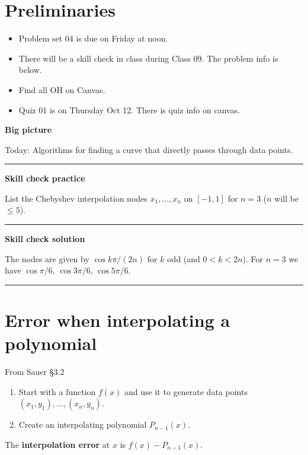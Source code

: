 \documentclass[12pt,letterpaper,noanswers]{exam}
\begin{document}
 \pdfpageheight 11in 
  \pdfpagewidth 8.5in

\noindent 

\section*{Preliminaries}

\begin{itemize}
\itemsep0pt
\item Problem set 04 is due on Friday at noon.
\item There will be a skill check in class during Class 09.  The problem info is below.
\item Find all OH on Canvas.
\item Quiz 01 is on Thursday Oct 12.  There is quiz info on canvas.
\end{itemize}



\noindent\textbf{Big picture}

Today: Algorithms for finding a curve that directly passes through data points.

\vspace{0.2cm}
\hrule
\vspace{0.2cm}

\noindent \textbf{Skill check practice}

List the Chebyshev interpolation nodes $x_1, ..., x_n$ on $[-1,1]$ for $n = 3$ ($n$ will be $\leq 5$).


\vspace{0.2cm}
\hrule
\vspace{0.2cm}

\noindent \textbf{Skill check solution}

The nodes are given by $\cos k\pi/(2n)$ for $k$ odd (and $0< k < 2n$).  For $n=3$ we have $\cos \pi/6$, $\cos 3\pi/6$, $\cos 5\pi/6$.



\vspace{0.2cm}
\hrule
\vspace{0.2cm}


\section*{Error when interpolating a polynomial}
From Sauer \S 3.2
\begin{tcolorbox}
\begin{enumerate}
    \item Start with a function $f(x)$ and use it to generate data points $(x_1, y_1), ..., (x_n, y_n)$.
    \item Create an interpolating polynomial $P_{n-1}(x)$.
\end{enumerate}
The \textbf{interpolation error} at $x$ is $f(x) - P_{n-1}(x)$.
\end{tcolorbox}
\end{document}
